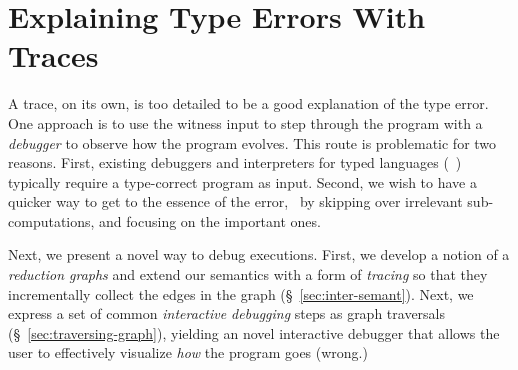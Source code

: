\section{Explaining Type Errors With Traces}
\label{sec:interactive}

A trace, on its own, is too detailed to be
a good explanation of the type error. One approach
is to use the witness input to step through the
program with a \emph{debugger} to observe how
the program evolves.
%
This route is problematic for two reasons.
%
First, existing debuggers and interpreters for
typed languages (\eg\ \ocaml) typically require
a type-correct program as input.
%
Second, we wish to have a quicker way to get
to the essence of the error, \eg\ by skipping
over irrelevant sub-computations, and focusing
on the important ones.

Next, we present a novel way to debug executions.
%
First, we develop a notion of a \emph{reduction graphs}
and extend our semantics with a form of \emph{tracing}
so that they incrementally collect the edges
in the graph (\S~\ref{sec:inter-semant}).
%
Next, we express a set of common \emph{interactive debugging}
steps as graph traversals (\S~\ref{sec:traversing-graph}), yielding
an novel interactive debugger that allows the user
to effectively visualize \emph{how} the program goes (wrong.)

